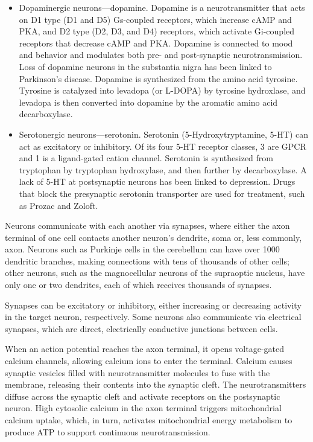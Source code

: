 \begin{itemize}
\item
  Dopaminergic neurons---dopamine. Dopamine is a neurotransmitter that acts on D1 type (D1 and D5) Gs-coupled receptors, which increase cAMP and PKA, and D2 type (D2, D3, and D4) receptors, which activate Gi-coupled receptors that decrease cAMP and PKA. Dopamine is connected to mood and behavior and modulates both pre- and post-synaptic neurotransmission. Loss of dopamine neurons in the substantia nigra has been linked to Parkinson's disease. Dopamine is synthesized from the amino acid tyrosine. Tyrosine is catalyzed into levadopa (or L-DOPA) by tyrosine hydroxlase, and levadopa is then converted into dopamine by the aromatic amino acid decarboxylase.
\item
  Serotonergic neurons---serotonin. Serotonin (5-Hydroxytryptamine, 5-HT) can act as excitatory or inhibitory. Of its four 5-HT receptor classes, 3 are GPCR and 1 is a ligand-gated cation channel. Serotonin is synthesized from tryptophan by tryptophan hydroxylase, and then further by decarboxylase. A lack of 5-HT at postsynaptic neurons has been linked to depression. Drugs that block the presynaptic serotonin transporter are used for treatment, such as Prozac and Zoloft.
\end{itemize}

Neurons communicate with each another via synapses, where either the axon terminal of one cell contacts another neuron's dendrite, soma or, less commonly, axon. Neurons such as Purkinje cells in the cerebellum can have over 1000 dendritic branches, making connections with tens of thousands of other cells; other neurons, such as the magnocellular neurons of the supraoptic nucleus, have only one or two dendrites, each of which receives thousands of synapses.

Synapses can be excitatory or inhibitory, either increasing or decreasing activity in the target neuron, respectively. Some neurons also communicate via electrical synapses, which are direct, electrically conductive junctions between cells.

When an action potential reaches the axon terminal, it opens voltage-gated calcium channels, allowing calcium ions to enter the terminal. Calcium causes synaptic vesicles filled with neurotransmitter molecules to fuse with the membrane, releasing their contents into the synaptic cleft. The neurotransmitters diffuse across the synaptic cleft and activate receptors on the postsynaptic neuron. High cytosolic calcium in the axon terminal triggers mitochondrial calcium uptake, which, in turn, activates mitochondrial energy metabolism to produce ATP to support continuous neurotransmission.

